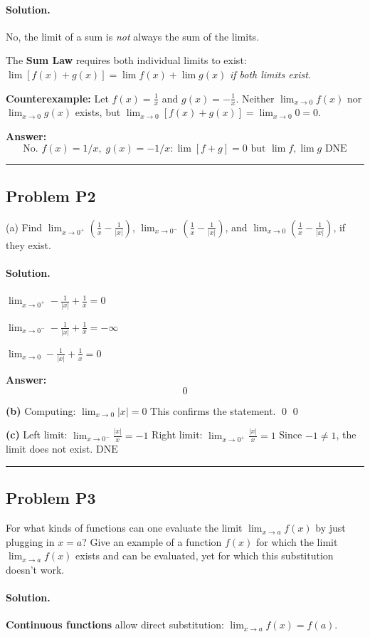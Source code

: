 \documentclass[12pt, a4paper]{article}
\newcommand{\problem}[1]{\subsection*{Problem #1}}
\newcommand{\solution}{\paragraph{Solution.}}
\begin{document}
\solution

No, the limit of a sum is \emph{not} always the sum of the limits.

The \textbf{Sum Law} requires both individual limits to exist: $\lim[f(x)+g(x)] = \lim f(x) + \lim g(x)$ \emph{if both limits exist}.

\textbf{Counterexample:} Let $f(x) = \frac{1}{x}$ and $g(x) = -\frac{1}{x}$. Neither $\lim_{x \to 0} f(x)$ nor $\lim_{x \to 0} g(x)$ exists, but $\lim_{x \to 0}[f(x)+g(x)] = \lim_{x \to 0} 0 = 0$.

\textbf{Answer:}
\[\boxed{\text{No. } f(x)=1/x,\; g(x)=-1/x: \lim[f+g]=0 \text{ but } \lim f, \lim g \text{ DNE}}\]

\vspace{1em}
\hrule
\vspace{1em}

\problem{P2}

(a) Find $\lim_{x \to 0^+}(\frac{1}{x} - \frac{1}{|x|})$, $\lim_{x \to 0^-}(\frac{1}{x} - \frac{1}{|x|})$, and $\lim_{x \to 0}(\frac{1}{x} - \frac{1}{|x|})$, if they exist.

\solution

$\lim_{x \to 0^+} - \frac{1}{\left|{x}\right|} + \frac{1}{x} = 0$

$\lim_{x \to 0^-} - \frac{1}{\left|{x}\right|} + \frac{1}{x} = -\infty$

$\lim_{x \to 0} - \frac{1}{\left|{x}\right|} + \frac{1}{x} = 0$

\textbf{Answer:}
\[\boxed{0}\]

\textbf{(b)}
Computing: $\lim_{x \to 0} \left|{x}\right| = 0$
This confirms the statement. \qed
$\boxed{0}$

\textbf{(c)}
Left limit: $\lim_{x \to 0^-} \frac{\left|{x}\right|}{x} = -1$
Right limit: $\lim_{x \to 0^+} \frac{\left|{x}\right|}{x} = 1$
Since $-1 \neq 1$, the limit does not exist.
$\boxed{\text{DNE}}$

\vspace{1em}
\hrule
\vspace{1em}

\problem{P3}

For what kinds of functions can one evaluate the limit $\lim_{x \to a} f(x)$ by just plugging in $x = a$? Give an example of a function $f(x)$ for which the limit $\lim_{x \to a} f(x)$ exists and can be evaluated, yet for which this substitution doesn't work.

\solution

\textbf{Continuous functions} allow direct substitution: $\lim_{x \to a} f(x) = f(a)$.
\end{document}
